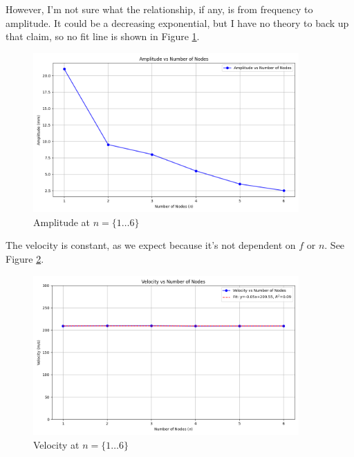 \documentclass[12pt,letterpaper]{article}
\begin{document}
However, I'm not sure what the relationship, if any, is from frequency to amplitude. It could be a decreasing exponential, but I have no theory to back up that claim, so no fit line is shown in Figure \ref{fig:amplitude}.

\begin{figure}[h]
    \centering
    \includegraphics[width=4in]{images/amplitude1-6.png}
    \caption{Amplitude at $n=\{1\dots6\}$}
    \label{fig:amplitude}
\end{figure}

The velocity is constant, as we expect because it's not dependent on $f$ or $n$. See Figure \ref{fig:velocity}.

\begin{figure}[h]
    \centering
    \includegraphics[width=4in]{images/velocity_vs_nodes.png}
    \caption{Velocity at $n=\{1\dots6\}$}
    \label{fig:velocity}
\end{figure}
\end{document}
